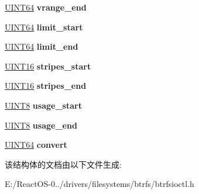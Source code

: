 \begin{DoxyCompactItemize}
\hyperlink{_processor_bind_8h_a57be03562867144161c1bfee95ca8f7c}{U\+I\+N\+T64} {\bfseries vrange\+\_\+end}
\item 
\mbox{\label{structbtrfs__balance__opts_aee148af112498da1e6805f910773ce26}} 
\hyperlink{_processor_bind_8h_a57be03562867144161c1bfee95ca8f7c}{U\+I\+N\+T64} {\bfseries limit\+\_\+start}
\item 
\mbox{\label{structbtrfs__balance__opts_a914a7612f30564ecca6d21f9e1063229}} 
\hyperlink{_processor_bind_8h_a57be03562867144161c1bfee95ca8f7c}{U\+I\+N\+T64} {\bfseries limit\+\_\+end}
\item 
\mbox{\label{structbtrfs__balance__opts_a27dd7ca2091e0232b85891a802d4cb13}} 
\hyperlink{_processor_bind_8h_a09f1a1fb2293e33483cc8d44aefb1eb1}{U\+I\+N\+T16} {\bfseries stripes\+\_\+start}
\item 
\mbox{\label{structbtrfs__balance__opts_ac999c2c216f6bed660133f246e9618f3}} 
\hyperlink{_processor_bind_8h_a09f1a1fb2293e33483cc8d44aefb1eb1}{U\+I\+N\+T16} {\bfseries stripes\+\_\+end}
\item 
\mbox{\label{structbtrfs__balance__opts_a9b5e55d2667a97bbf42a9d1f80d08aea}} 
\hyperlink{_processor_bind_8h_ab27e9918b538ce9d8ca692479b375b6a}{U\+I\+N\+T8} {\bfseries usage\+\_\+start}
\item 
\mbox{\label{structbtrfs__balance__opts_ae20a3babf83bd69e55ac45138246caaa}} 
\hyperlink{_processor_bind_8h_ab27e9918b538ce9d8ca692479b375b6a}{U\+I\+N\+T8} {\bfseries usage\+\_\+end}
\item 
\mbox{\label{structbtrfs__balance__opts_afb508aaf8d530a8297cc171f8f47cf44}} 
\hyperlink{_processor_bind_8h_a57be03562867144161c1bfee95ca8f7c}{U\+I\+N\+T64} {\bfseries convert}
\end{DoxyCompactItemize}


该结构体的文档由以下文件生成\+:\begin{DoxyCompactItemize}
\item 
E\+:/\+React\+O\+S-\/0../drivers/filesystems/btrfs/btrfsioctl.\+h\end{DoxyCompactItemize}
